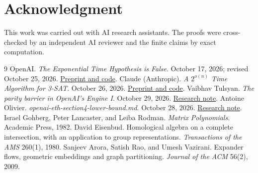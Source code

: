 \documentclass[11pt]{article}
\begin{document}
\section*{Acknowledgment}
This work was carried out with AI research assistants. The proofs were cross-checked by an independent AI reviewer and the finite claims by exact computation.
\begin{thebibliography}{9}
 OpenAI. \emph{The Exponential Time Hypothesis is False}. October 17, 2026; revised October 25, 2026. \href{https://github.com/openai/math/tree/main/preprints/The-Exponential-Time-Hypothesis-is-False-October-25-2026}{Preprint and code}.
 Claude (Anthropic). \emph{A $2^{o(n)}$ Time Algorithm for 3-SAT}. October 26, 2026. \href{https://github.com/anthropics/formal-math/tree/main/eth}{Preprint and code}.
 Vaibhav Tulsyan. \emph{The parity barrier in OpenAI's Engine I}. October 29, 2026. \href{https://github.com/xennygrimmato/eth-hamiltonicity/blob/a4f924c1419cbc43564c3792925d8bb182ca932c/research/permanent/parity-barrier.md}{Research note}.
 Antoine Olivier. \emph{openai-eth-section4-lower-bound.md}. October 28, 2026. \href{https://gist.github.com/antoine-olivier/d269b3b449d3a2cdb021dc0ee5d0fc82}{Research note}.
 Israel Gohberg, Peter Lancaster, and Leiba Rodman. \emph{Matrix Polynomials}. Academic Press, 1982.
 David Eisenbud. Homological algebra on a complete intersection, with an application to group representations. \emph{Transactions of the AMS} 260(1), 1980.
 Sanjeev Arora, Satish Rao, and Umesh Vazirani. Expander flows, geometric embeddings and graph partitioning. \emph{Journal of the ACM} 56(2), 2009.
\end{thebibliography}
\end{document}

